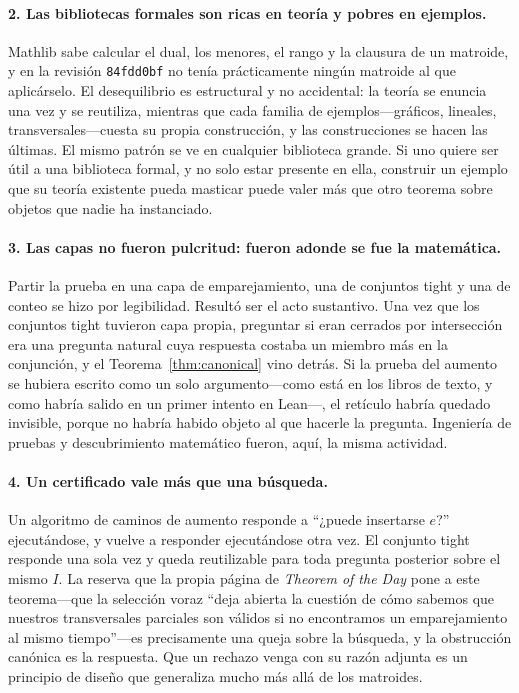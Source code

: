 \documentclass[11pt]{article}
\newcommand{\lean}[1]{\texttt{#1}}
\begin{document}
\paragraph{2. Las bibliotecas formales son ricas en teoría y pobres en ejemplos.}
Mathlib sabe calcular el dual, los menores, el rango y la clausura de un matroide, y en la revisión
\lean{84fdd0bf} no tenía prácticamente ningún matroide al que aplicárselo. El desequilibrio es
estructural y no accidental: la teoría se enuncia una vez y se reutiliza, mientras que cada familia
de ejemplos---gráficos, lineales, transversales---cuesta su propia construcción, y las
construcciones se hacen las últimas. El mismo patrón se ve en cualquier biblioteca grande. Si uno
quiere ser útil a una biblioteca formal, y no solo estar presente en ella, construir un ejemplo que
su teoría existente pueda masticar puede valer más que otro teorema sobre objetos que nadie ha
instanciado.

\paragraph{3. Las capas no fueron pulcritud: fueron adonde se fue la matemática.}
Partir la prueba en una capa de emparejamiento, una de conjuntos tight y una de conteo se hizo por
legibilidad. Resultó ser el acto sustantivo. Una vez que los conjuntos tight tuvieron capa propia,
preguntar si eran cerrados por intersección era una pregunta natural cuya respuesta costaba un
miembro más en la conjunción, y el Teorema~\ref{thm:canonical} vino detrás. Si la prueba del aumento
se hubiera escrito como un solo argumento---como está en los libros de texto, y como habría salido
en un primer intento en Lean---, el retículo habría quedado invisible, porque no habría habido
objeto al que hacerle la pregunta. Ingeniería de pruebas y descubrimiento matemático fueron, aquí,
la misma actividad.

\paragraph{4. Un certificado vale más que una búsqueda.}
Un algoritmo de caminos de aumento responde a ``¿puede insertarse $e$?'' ejecutándose, y vuelve a
responder ejecutándose otra vez. El conjunto tight responde una sola vez y queda reutilizable para
toda pregunta posterior sobre el mismo $I$. La reserva que la propia página de \emph{Theorem of the
Day} pone a este teorema---que la selección voraz ``deja abierta la cuestión de cómo sabemos que
nuestros transversales parciales son válidos si no encontramos un emparejamiento al mismo
tiempo''---es precisamente una queja sobre la búsqueda, y la obstrucción canónica es la respuesta.
Que un rechazo venga con su razón adjunta es un principio de diseño que generaliza mucho más allá de
los matroides.
\end{document}
